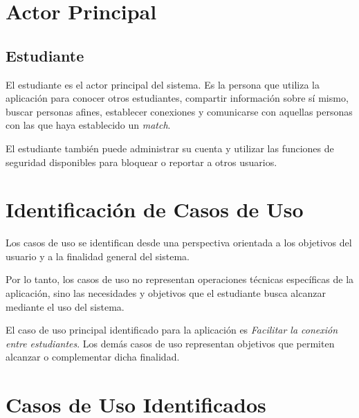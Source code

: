 \documentclass[11pt,a4paper]{article}
\begin{document}

\section{Actor Principal}

\subsection{Estudiante}

El estudiante es el actor principal del sistema. Es la persona que utiliza la
aplicación para conocer otros estudiantes, compartir información sobre sí mismo,
buscar personas afines, establecer conexiones y comunicarse con aquellas personas
con las que haya establecido un \textit{match}.

El estudiante también puede administrar su cuenta y utilizar las funciones de
seguridad disponibles para bloquear o reportar a otros usuarios.


\section{Identificación de Casos de Uso}

Los casos de uso se identifican desde una perspectiva orientada a los objetivos
del usuario y a la finalidad general del sistema.

Por lo tanto, los casos de uso no representan operaciones técnicas específicas de
la aplicación, sino las necesidades y objetivos que el estudiante busca alcanzar
mediante el uso del sistema.

El caso de uso principal identificado para la aplicación es
\textit{Facilitar la conexión entre estudiantes}. Los demás casos de uso
representan objetivos que permiten alcanzar o complementar dicha finalidad.


\section{Casos de Uso Identificados}
\end{document}
